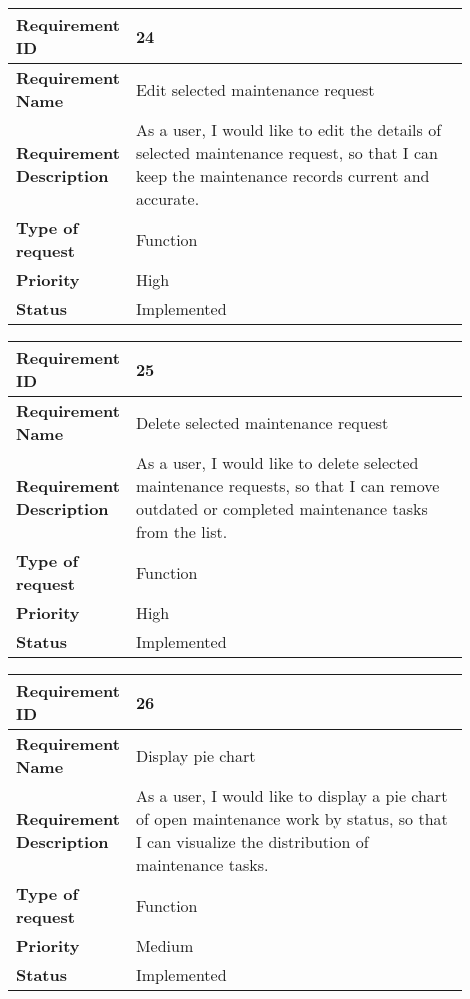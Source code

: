 \begin{table}[htbp]
\centering
\begin{tabular}{|m{0.15\linewidth}|m{0.75\linewidth}|}
\hline
\textbf{Requirement ID} & 24 \\
\hline
\textbf{Requirement Name} & Edit selected maintenance request \\
\hline
\textbf{Requirement Description} & As a user, I would like to edit the details of selected maintenance request, so that I can keep the maintenance records current and accurate. \\
\hline
\textbf{Type of request} & Function \\
\hline
\textbf{Priority} & High \\
\hline
\textbf{Status} & Implemented \\
\hline
\end{tabular}
\end{table}

\begin{table}[htbp]
\centering
\begin{tabular}{|m{0.15\linewidth}|m{0.75\linewidth}|}
\hline
\textbf{Requirement ID} & 25 \\
\hline
\textbf{Requirement Name} & Delete selected maintenance request \\
\hline
\textbf{Requirement Description} & As a user, I would like to delete selected maintenance requests, so that I can remove outdated or completed maintenance tasks from the list. \\
\hline
\textbf{Type of request} & Function \\
\hline
\textbf{Priority} & High \\
\hline
\textbf{Status} & Implemented \\
\hline
\end{tabular}
\end{table}

\begin{table}[htbp]
\centering
\begin{tabular}{|m{0.15\linewidth}|m{0.75\linewidth}|}
\hline
\textbf{Requirement ID} & 26 \\
\hline
\textbf{Requirement Name} & Display pie chart \\
\hline
\textbf{Requirement Description} & As a user, I would like to display a pie chart of open maintenance work by status, so that I can visualize the distribution of maintenance tasks. \\
\hline
\textbf{Type of request} & Function \\
\hline
\textbf{Priority} & Medium \\
\hline
\textbf{Status} & Implemented \\
\hline
\end{tabular}
\end{table}

